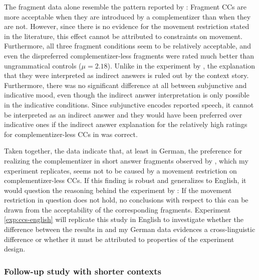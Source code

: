 The fragment data alone resemble the pattern reported by \citet{merchant.etal2013}: Fragment CCs are more acceptable when they are introduced by a complementizer than when they are not. However, since there is no evidence for the movement restriction stated in the literature, this effect cannot be attributed to constraints on movement. Furthermore, all three fragment conditions seem to be relatively acceptable, and even the dispreferred complementizer-less fragments were rated much better than ungrammatical controls ($\mu = 2.18$). Unlike in the experiment by \citet{merchant.etal2013}, the explanation that they were interpreted as indirect answers is ruled out by the context story. Furthermore, there was no significant difference at all between subjunctive and indicative mood, even though the indirect answer interpretation is only possible in the indicative conditions. Since subjunctive encodes reported speech,  it cannot be interpreted as an indirect answer and they would have been preferred over indicative ones if the indirect answer explanation for the relatively high ratings for complementizer-less CCs in \citet{merchant.etal2013} was correct.

Taken together, the data indicate that, at least in German, the preference for realizing the complementizer in short answer fragments observed by \citet{merchant.etal2013}, which my experiment replicates, seems not to be caused by a movement restriction on complementizer-less CCs. If this finding is robust and generalizes to English, it would question the reasoning behind the experiment by \citet{merchant.etal2013}: If the movement restriction in question does not hold, no conclusions with respect to this can be drawn from the acceptability of the corresponding fragments. Experiment \ref{exp:ccs-english} will replicate this study in English to investigate whether the difference between the results in \citet{merchant.etal2013} and my German data evidences a cross-linguistic difference or whether it must be attributed to properties of the experiment design.

\subsubsection{Follow-up study with shorter contexts}

